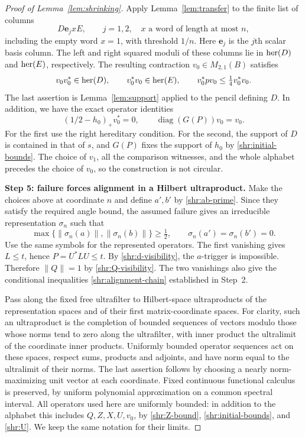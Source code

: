 \begin{proof}[Proof of Lemma~\ref{lem:shrinking}]
Apply Lemma~\ref{lem:transfer} to the finite list of columns
\begin{equation}\label{shr:word-tests}
 D\mathbf e_jxE,\qquad j=1,2,\quad
 x\text{ a word of length at most }n,
\end{equation}
including the empty word $x=1$, with threshold $1/n$.  Here
$\mathbf e_j$ is the $j$th scalar basis column.  The left and right squared
moduli of these columns lie in $\operatorname{her}(D)$ and $\operatorname{her}(E)$, respectively.
The resulting contraction $v_0\in M_{2,1}(B)$ satisfies
\begin{equation}\label{shr:v0}
 v_0v_0^*\in\operatorname{her}(D),\qquad v_0^*v_0\in\operatorname{her}(E),\qquad
 v_0^*pv_0\le\tfrac14v_0^*v_0.
\end{equation}
The last assertion is Lemma~\ref{lem:support} applied to the pencil
defining $D$.  In addition, we have the exact operator identities
\begin{equation}\label{shr:v0-fixed}
 (1/2-h_0)_+v_0^*=0,\qquad
 \operatorname{diag}(G(P))v_0=v_0.
\end{equation}
For the first use the right hereditary condition.  For the second, the
support of $D$ is contained in that of $s$, and $G(P)$ fixes the support
of $h_0$ by \eqref{shr:initial-bounds}.  The choice of $v_1$, all the
comparison witnesses, and the whole alphabet precedes the choice of
$v_0$, so the construction is not circular.

\medskip
\noindent\textbf{Step 5: failure forces alignment in a Hilbert ultraproduct.}
Make the choices above at coordinate $n$ and define $a',b'$ by
\eqref{shr:ab-prime}.  Since they satisfy the required angle bound, the
assumed failure gives an irreducible representation $\sigma_n$ such that
\[
 \max\{\|\sigma_n(a)\|,\|\sigma_n(b)\|\}\ge\tfrac12,
 \qquad \sigma_n(a')=\sigma_n(b')=0.
\]
Use the same symbols for the represented operators.  The first vanishing
gives $L\le t$, hence $P=U^*LU\le t$.  By
\eqref{shr:d-visibility}, the $a$-trigger is impossible.  Therefore
$\|Q\|=1$ by \eqref{shr:Q-visibility}.  The two vanishings also give
the conditional inequalities \eqref{shr:alignment-chain} established
in Step~2.

Pass along the fixed free ultrafilter to Hilbert-space ultraproducts of
the representation spaces and of their first matrix-coordinate spaces.
For clarity, such an ultraproduct is the completion of bounded sequences
of vectors modulo those whose norms tend to zero along the ultrafilter,
with inner product the ultralimit of the coordinate inner products.
Uniformly bounded operator sequences act on these spaces, respect sums,
products and adjoints, and have norm equal to the ultralimit of their
norms.  The last assertion follows by choosing a nearly norm-maximizing
unit vector at each coordinate.  Fixed continuous functional calculus is
preserved, by uniform polynomial approximation on a common spectral
interval.  All operators used here are uniformly bounded: in addition to
the alphabet this includes $Q,Z,X,U,v_0$, by
\eqref{shr:Z-bound}, \eqref{shr:initial-bounds}, and \eqref{shr:U}.
We keep the same notation for their limits.


\end{proof}
